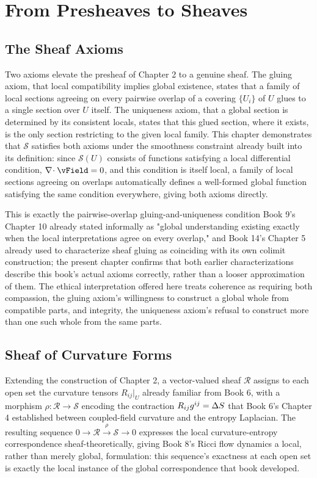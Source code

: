 \part{From Presheaves to Sheaves}

\chapter{The Sheaf Axioms}

Two axioms elevate the presheaf of Chapter 2 to a genuine sheaf. The gluing axiom, that local compatibility implies global existence, states that a family of local sections agreeing on every pairwise overlap of a covering $\{U_i\}$ of $U$ glues to a single section over $U$ itself. The uniqueness axiom, that a global section is determined by its consistent locals, states that this glued section, where it exists, is the only section restricting to the given local family. This chapter demonstrates that $\mathcal{S}$ satisfies both axioms under the smoothness constraint already built into its definition: since $\mathcal{S}(U)$ consists of functions satisfying a local differential condition, $\diverg \vField = 0$, and this condition is itself local, a family of local sections agreeing on overlaps automatically defines a well-formed global function satisfying the same condition everywhere, giving both axioms directly.

This is exactly the pairwise-overlap gluing-and-uniqueness condition Book 9's Chapter 10 already stated informally as "global understanding existing exactly when the local interpretations agree on every overlap," and Book 14's Chapter 5 already used to characterize sheaf gluing as coinciding with its own colimit construction; the present chapter confirms that both earlier characterizations describe this book's actual axioms correctly, rather than a looser approximation of them. The ethical interpretation offered here treats coherence as requiring both compassion, the gluing axiom's willingness to construct a global whole from compatible parts, and integrity, the uniqueness axiom's refusal to construct more than one such whole from the same parts.

\chapter{Sheaf of Curvature Forms}

Extending the construction of Chapter 2, a vector-valued sheaf $\mathcal{R}$ assigns to each open set the curvature tensors $R_{ij}|_U$ already familiar from Book 6, with a morphism $\rho: \mathcal{R} \to \mathcal{S}$ encoding the contraction $R_{ij} g^{ij} = \Delta S$ that Book 6's Chapter 4 established between coupled-field curvature and the entropy Laplacian. The resulting sequence $0 \to \mathcal{R} \xrightarrow{\rho} \mathcal{S} \to 0$ expresses the local curvature-entropy correspondence sheaf-theoretically, giving Book 8's Ricci flow dynamics a local, rather than merely global, formulation: this sequence's exactness at each open set is exactly the local instance of the global correspondence that book developed.

